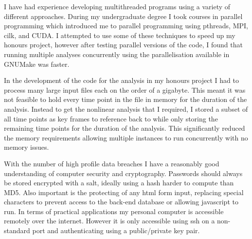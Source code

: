 
I have had experience developing multithreaded programs using a variety of different approaches. During my undergraduate degree I took courses in parallel programming which introduced me to parallel programming using pthreads, MPI, cilk, and CUDA. I attempted to use some of these techniques to speed up my honours project, however after testing parallel versions of the code, I found that running multiple analyses concurrently using the parallelisation available in GNUMake was faster.


In the development of the code for the analysis in my honours project I had to process many large input files each on the order of a gigabyte. This meant it was not feasible to hold every time point in the file in memory for the duration of the analysis. Instead to get the nonlinear analysis that I required, I stored a subset of all time points as key frames to reference back to while only storing the remaining time points for the duration of the analysis. This significantly reduced the memory requirements allowing multiple instances to run concurrently with no memory issues.


With the number of high profile data breaches I have a reasonably good understanding of computer security and cryptography. Passwords should always be stored encrypted with a salt, ideally using a hash harder to compute than MD5. Also important is the protecting of any html form input, replacing special characters to prevent access to the back-end database or allowing javascript to run. In terms of practical applications my personal computer is accessible remotely over the internet. However it is only accessible using ssh on a non-standard port and authenticating using a public/private key pair.

\makeletterclosing


